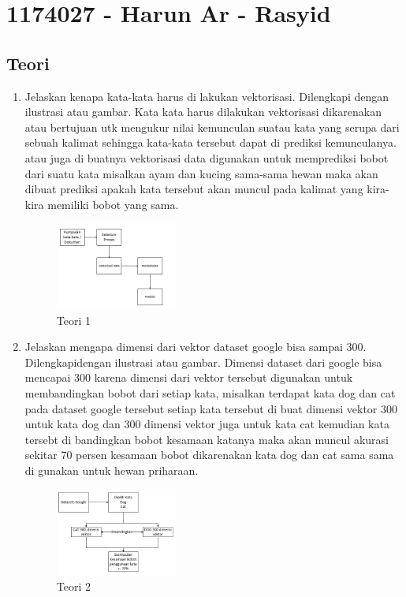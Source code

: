 \section{1174027 - Harun Ar - Rasyid}
\subsection{Teori}
\begin{enumerate}
	\item Jelaskan kenapa kata-kata harus di lakukan vektorisasi. Dilengkapi dengan ilustrasi atau gambar.
	\hfill\break
	Kata kata harus dilakukan vektorisasi dikarenakan atau bertujuan utk mengukur nilai kemunculan suatau kata yang serupa dari sebuah kalimat sehingga kata-kata tersebut dapat di prediksi kemunculanya. atau juga di buatnya vektorisasi data digunakan untuk memprediksi bobot dari suatu kata misalkan ayam dan kucing sama-sama hewan maka akan dibuat prediksi apakah kata tersebut akan muncul pada kalimat yang kira-kira memiliki bobot yang sama.
	\hfill\break
	\begin{figure}[H]
		\includegraphics[width=4cm]{figures/1174027/5/1.png}
		\centering
		\caption{Teori 1}
	\end{figure}

	\item Jelaskan mengapa dimensi dari vektor dataset google bisa sampai 300. Dilengkapidengan ilustrasi atau gambar.
	\hfill\break
	Dimensi dataset dari google bisa mencapai 300 karena dimensi dari vektor tersebut digunakan untuk membandingkan bobot dari setiap kata, misalkan terdapat kata dog dan cat pada dataset google tersebut setiap kata tersebut di buat dimensi vektor 300 untuk kata dog dan 300 dimensi vektor juga untuk kata cat kemudian kata tersebt di bandingkan bobot kesamaan katanya maka akan muncul akurasi sekitar 70 persen kesamaan bobot dikarenakan kata dog dan cat sama sama di gunakan untuk hewan priharaan.
	\hfill\break
	\begin{figure}[H]
		\includegraphics[width=4cm]{figures/1174027/5/2.png}
		\centering
		\caption{Teori 2}
	\end{figure}


\end{enumerate}
